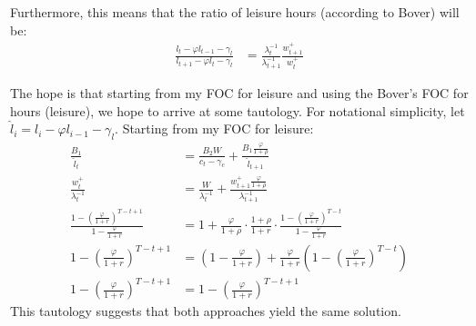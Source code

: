 \documentclass[\econtexRoot/ProjectMMD]{subfiles}
\begin{document}
Furthermore, this means that the ratio of leisure hours (according to Bover) will be:
\begin{align}
  \frac{ l_t - \varphi l_{t-1} - \gamma_l}{l_{t+1} - \varphi l_t - \gamma_l} &= \frac{\lambda_t^{-1}}{\lambda_{t+1}^{-1}} \frac{w_{t+1}^{+}}{w_t^{+}} \label{eq:bover_focl_ratio}
\end{align}

The hope is that starting from my FOC for leisure and using the Bover's FOC for hours (leisure), we hope to arrive at some tautology. For notational simplicity, let $\hat{l}_i =l_i - \varphi l_{i-1} - \gamma_l$. Starting from my FOC for leisure:
\begin{align*}
  \frac{B_1}{\hat{l}_t} &= \frac{B_2 W}{c_t - \gamma_c} + \frac{B_1\frac{ \varphi}{1+\rho}}{\hat{l}_{t+1}} \\
  \frac{w_t^{+}}{\lambda_t^{-1}} &= \frac{W}{\lambda_t^{-1}} + \frac{w_{t+1}^{+} \frac{\varphi}{1+\rho}}{\lambda_{t+1}^{-1}} \\
  \frac{1 - \left( \frac{\varphi}{1+r} \right)^{T-t+1}}{1- \frac{\varphi}{1+r}} &= 1 + \frac{\varphi}{1+\rho}\cdot \frac{1+\rho}{1+r}\cdot \frac{1 - \left( \frac{\varphi}{1+r} \right)^{T-t}}{1- \frac{\varphi}{1+r}}  \\
  1 - \left( \frac{\varphi}{1+r} \right)^{T-t+1} &=\left(1 - \frac{\varphi}{1+r}\right) +\frac{\varphi}{1+r} \left( 1- \left( \frac{\varphi}{1+r}\right)^{T-t} \right) \\
  1 - \left( \frac{\varphi}{1+r} \right)^{T-t+1} &= 1 - \left( \frac{\varphi}{1+r} \right)^{T-t+1}
\end{align*}
This tautology suggests that both approaches yield the same solution.

%
\onlyinsubfile{}
\end{document}
